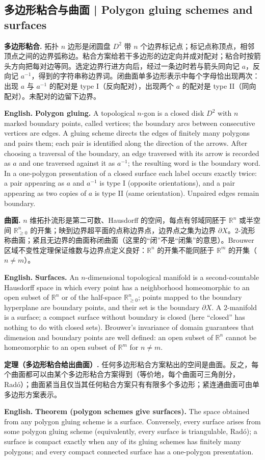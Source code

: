\documentclass[UTF8,11pt,a4paper]{ctexart}
\newcommand{\EN}[1]{\par\noindent\textbf{English.} #1\par}
\begin{document}
\subsection{多边形粘合与曲面 | Polygon gluing schemes and surfaces}
\noindent\textbf{多边形粘合.} 拓扑 $n$ 边形是闭圆盘 $D^2$ 带 $n$ 个边界标记点；标记点称顶点，相邻顶点之间的边界弧称边。粘合方案给若干多边形的边定向并成对配对；粘合时按箭头方向把每对边等同。选定边界行进方向后，经过一条边时若与箭头同向记 $a$，反向记 $a^{-1}$，得到的字符串称边界词。闭曲面单多边形表示中每个字母恰出现两次：出现 $a$ 与 $a^{-1}$ 的配对是 type I（反向配对），出现两个 $a$ 的配对是 type II（同向配对）。未配对的边留下边界。
\EN{\textbf{Polygon gluing.} A topological $n$-gon is a closed disk $D^2$ with $n$ marked boundary points, called vertices; the boundary arcs between consecutive vertices are edges. A gluing scheme directs the edges of finitely many polygons and pairs them; each pair is identified along the direction of the arrows. After choosing a traversal of the boundary, an edge traversed with its arrow is recorded as $a$ and one traversed against it as $a^{-1}$; the resulting word is the boundary word. In a one-polygon presentation of a closed surface each label occurs exactly twice: a pair appearing as $a$ and $a^{-1}$ is type I (opposite orientations), and a pair appearing as two copies of $a$ is type II (same orientation). Unpaired edges remain boundary.}

\noindent\textbf{曲面.} $n$ 维拓扑流形是第二可数、Hausdorff 的空间，每点有邻域同胚于 $\mathbb R^n$ 或半空间 $\mathbb R^n_{\ge0}$ 的开集；映到边界超平面的点称边界点，边界点之集为边界 $\partial X$。$2$-流形称曲面；紧且无边界的曲面称闭曲面（这里的“闭”不是“闭集”的意思）。Brouwer 区域不变性定理保证维数与边界点定义良好：$\mathbb R^n$ 的开集不能同胚于 $\mathbb R^m$ 的开集（$n\ne m$）。
\EN{\textbf{Surfaces.} An $n$-dimensional topological manifold is a second-countable Hausdorff space in which every point has a neighborhood homeomorphic to an open subset of $\mathbb R^n$ or of the half-space $\mathbb R^n_{\ge0}$; points mapped to the boundary hyperplane are boundary points, and their set is the boundary $\partial X$. A $2$-manifold is a surface; a compact surface without boundary is closed (here ``closed'' has nothing to do with closed sets). Brouwer's invariance of domain guarantees that dimension and boundary points are well defined: an open subset of $\mathbb R^n$ cannot be homeomorphic to an open subset of $\mathbb R^m$ for $n\ne m$.}

\noindent\textbf{定理（多边形粘合给出曲面）.} 任何多边形粘合方案粘出的空间是曲面。反之，每个曲面都可以由某个多边形粘合方案得到（等价地，每个曲面可三角剖分，Rad\'o）；曲面紧当且仅当其任何粘合方案只有有限多个多边形；紧连通曲面可由单多边形方案表示。
\EN{\textbf{Theorem (polygon schemes give surfaces).} The space obtained from any polygon gluing scheme is a surface. Conversely, every surface arises from some polygon gluing scheme (equivalently, every surface is triangulable, Rad\'o); a surface is compact exactly when any of its gluing schemes has finitely many polygons; and every compact connected surface has a one-polygon presentation.}
\end{document}
